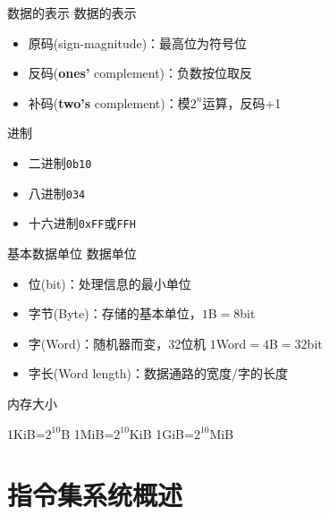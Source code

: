 \documentclass[UTF8]{ctexbeamer}
\begin{document}
\begin{frame}[fragile]{数据的表示}
数据的表示
\begin{itemize}
	\item 原码(sign-magnitude)：最高位为符号位
	\item 反码(\textbf{ones'} complement)：负数按位取反
	\item 补码(\textbf{two's} complement)：模$2^n$运算，反码+1
\end{itemize}
进制
\begin{itemize}
	\item 二进制\verb'0b10'
	\item 八进制\verb'034'
	\item 十六进制\verb'0xFF'或\verb'FFH'
\end{itemize}
\end{frame}

\begin{frame}{基本数据单位}
数据单位
\begin{itemize}
	\item 位(bit)：处理信息的最小单位
	\item 字节(Byte)：存储的基本单位，$1$B$=8$bit
	\item 字(Word)：随机器而变，32位机 $1$Word$=4$B$=32$bit
	\item 字长(Word length)：数据通路的宽度/字的长度
\end{itemize}
内存大小\\
\begin{center}
1KiB=$2^{10}$B\qquad
1MiB=$2^{10}$KiB\qquad
1GiB=$2^{10}$MiB
\end{center}
\end{frame}

\section{指令集系统概述}
\begin{frame}
\sectionpage
\end{frame}
\end{document}
